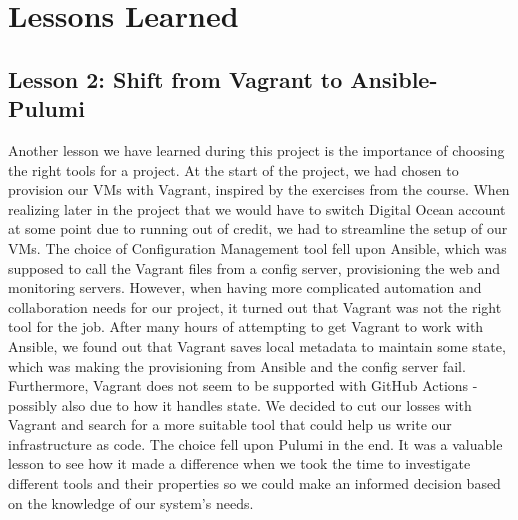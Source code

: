\section{Lessons Learned}

\subsection{Lesson 2: Shift from Vagrant to Ansible-Pulumi}
Another lesson we have learned during this project is the importance of choosing the right tools for a project.
At the start of the project, we had chosen to provision our VMs with Vagrant, inspired by the exercises from the course.
When realizing later in the project that we would have to switch Digital Ocean account at some point due to running out of credit, we had to streamline the setup of our VMs.
The choice of Configuration Management tool fell upon Ansible, which was supposed to call the Vagrant files from a config server, provisioning the web and monitoring servers.
However, when having more complicated automation and collaboration needs for our project, it turned out that Vagrant was not the right tool for the job.
After many hours of attempting to get Vagrant to work with Ansible, we found out that Vagrant saves local metadata to maintain some state, which was making the provisioning from Ansible and the config server fail\cite{issue178-vagrant-ansible}. Furthermore, Vagrant does not seem to be supported with GitHub Actions - possibly also due to how it handles state.
We decided to cut our losses with Vagrant and search for a more suitable tool that could help us write our infrastructure as code.
The choice fell upon Pulumi in the end.
It was a valuable lesson to see how it made a difference when we took the time to investigate different tools and their properties so we could make an informed decision based on the knowledge of our system's needs.
